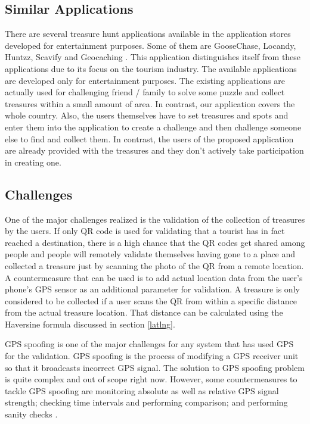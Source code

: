 \documentclass[12pt, a4paper, oneside]{article}
\begin{document}
\subsection{Similar Applications}
There are several treasure hunt applications available in the application stores developed for entertainment purposes. Some of them are GooseChase, Locandy, Huntzz, Scavify and Geocaching \cite{similarapps}. This application distinguishes itself from these applications due to its focus on the tourism industry. The available applications are developed only for entertainment purposes. The existing applications are actually used for challenging friend / family to solve some puzzle and collect treasures within a small amount of area. In contrast, our application covers the whole country. Also, the users themselves have to set treasures and spots and enter them into the application to create a challenge and then challenge someone else to find and collect them. In contrast, the users of the proposed application are already provided with the treasures and they don't actively take participation in creating one.

\subsection{Challenges}
One of the major challenges realized is the validation of the collection of treasures by the users. If only QR code is used for validating that a tourist has in fact reached a destination, there is a high chance that the QR codes get shared among people and people will remotely validate themselves having gone to a place and collected a treasure just by scanning the photo of the QR from a remote location. A countermeasure that can be used is to add actual location data from the user's phone's GPS sensor as an additional parameter for validation. A treasure is only considered to be collected if a user scans the QR from within a specific distance from the actual treasure location. That distance can be calculated using the Haversine formula discussed in section \ref{latlng}.

GPS spoofing is one of the major challenges for any system that has used GPS for the validation. GPS spoofing is the process of modifying a GPS receiver unit so that it broadcasts incorrect GPS signal. The solution to GPS spoofing problem is quite complex and out of scope right now. However, some countermeasures to tackle GPS spoofing are monitoring absolute as well as relative GPS signal strength; checking time intervals and performing comparison; and performing sanity checks \cite{gpsspoofmeasures}.
\end{document}
